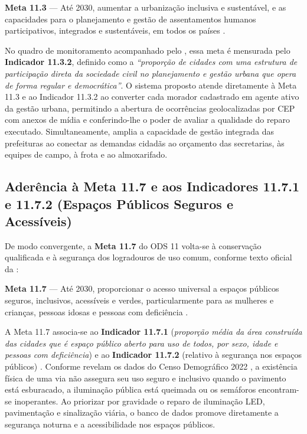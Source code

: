 \begin{citacao}
\textbf{Meta 11.3} --- Até 2030, aumentar a urbanização inclusiva e sustentável, e as capacidades para o planejamento e gestão de assentamentos humanos participativos, integrados e sustentáveis, em todos os países \cite{onubrasil2015ods11}.
\end{citacao}

No quadro de monitoramento acompanhado pelo , essa meta é mensurada pelo \textbf{Indicador 11.3.2}, definido como a \emph{``proporção de cidades com uma estrutura de participação direta da sociedade civil no planejamento e gestão urbana que opera de forma regular e democrática''}. O sistema proposto atende diretamente à Meta 11.3 e ao Indicador 11.3.2 ao converter cada morador cadastrado em agente ativo da gestão urbana, permitindo a abertura de ocorrências geolocalizadas por CEP com anexos de mídia e conferindo-lhe o poder de avaliar a qualidade do reparo executado. Simultaneamente, amplia a capacidade de gestão integrada das prefeituras ao conectar as demandas cidadãs ao orçamento das secretarias, às equipes de campo, à frota e ao almoxarifado.

\subsection{Aderência à Meta 11.7 e aos Indicadores 11.7.1 e 11.7.2 (Espaços Públicos Seguros e Acessíveis)}
\label{subsec:meta-11-7}

De modo convergente, a \textbf{Meta 11.7} do ODS 11 volta-se à conservação qualificada e à segurança dos logradouros de uso comum, conforme texto oficial da :

\begin{citacao}
\textbf{Meta 11.7} --- Até 2030, proporcionar o acesso universal a espaços públicos seguros, inclusivos, acessíveis e verdes, particularmente para as mulheres e crianças, pessoas idosas e pessoas com deficiência \cite{onubrasil2015ods11}.
\end{citacao}

A Meta 11.7 associa-se ao \textbf{Indicador 11.7.1} (\emph{proporção média da área construída das cidades que é espaço público aberto para uso de todos, por sexo, idade e pessoas com deficiência}) e ao \textbf{Indicador 11.7.2} (relativo à segurança nos espaços públicos) \cite{ipea2019ods11}. Conforme revelam os dados do Censo Demográfico 2022 \cite{ibge2025entorno}, a existência física de uma via não assegura seu uso seguro e inclusivo quando o pavimento está esburacado, a iluminação pública está queimada ou os semáforos encontram-se inoperantes. Ao priorizar por gravidade o reparo de iluminação LED, pavimentação e sinalização viária, o banco de dados promove diretamente a segurança noturna e a acessibilidade nos espaços públicos.

